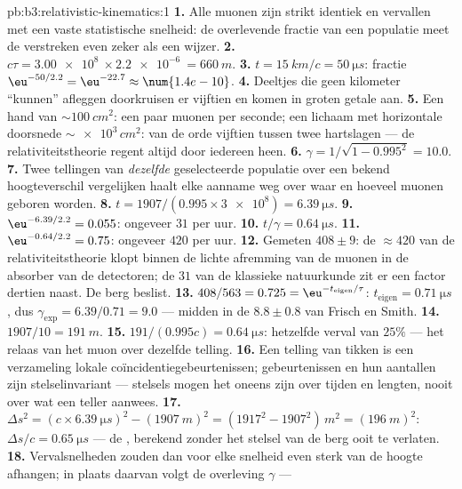 \begin{solution}{pb:b3:relativistic-kinematics:1}
\textbf{1.} Alle muonen zijn strikt identiek en vervallen met een vaste
statistische snelheid: de overlevende fractie van een populatie meet de
verstreken  even zeker als een wijzer.
\textbf{2.} $c\tau = \qty{3.00e8}{} \times \qty{2.2e-6}{} =
\qty{660}{m}$.
\textbf{3.} $t = \qty{15}{km}/c = \qty{50}{\micro s}$: fractie
$\eu^{-50/2.2} = \eu^{-22.7} \approx \num{1.4e-10}$.
\textbf{4.} Deeltjes die geen kilometer ``kunnen'' afleggen doorkruisen
er vijftien en komen in groten getale aan.
\textbf{5.} Een hand van $\sim\qty{100}{cm^2}$: een paar muonen per
seconde; een lichaam met horizontale doorsnede
$\sim\num{e3}\,\unit{cm^2}$: van de orde vijftien tussen twee
hartslagen --- de relativiteitstheorie regent altijd door iedereen heen.
\textbf{6.} $\gamma = 1/\sqrt{1 - 0.995^2} = 10.0$.
\textbf{7.} Twee tellingen van \emph{dezelfde} geselecteerde populatie
over een bekend hoogteverschil vergelijken haalt elke aanname weg over
waar en hoeveel muonen geboren worden.
\textbf{8.} $t = 1907/(0.995 \times \num{3e8}) = \qty{6.39}{\micro s}$.
\textbf{9.} $\eu^{-6.39/2.2} = 0.055$: ongeveer $31$ per uur.
\textbf{10.} $t/\gamma = \qty{0.64}{\micro s}$.
\textbf{11.} $\eu^{-0.64/2.2} = 0.75$: ongeveer $420$ per uur.
\textbf{12.} Gemeten $408 \pm 9$: de $\approx 420$ van de
relativiteitstheorie klopt binnen de lichte afremming van de muonen in
de absorber van de detectoren; de $31$ van de klassieke natuurkunde zit
er een factor dertien naast. De berg beslist.
\textbf{13.} $408/563 = 0.725 = \eu^{-t_{\text{eigen}}/\tau}$:
$t_{\text{eigen}} = \qty{0.71}{\micro s}$, dus $\gamma_{\exp} =
6.39/0.71 = 9.0$ --- midden in de $8.8 \pm 0.8$ van Frisch en Smith.
\textbf{14.} $1907/10 = \qty{191}{m}$.
\textbf{15.} $191/(0.995c) = \qty{0.64}{\micro s}$: hetzelfde verval van
$25\%$ --- het relaas van het muon over dezelfde telling.
\textbf{16.} Een telling van tikken is een verzameling lokale
coïncidentiegebeurtenissen; gebeurtenissen en hun aantallen zijn
stelselinvariant --- stelsels mogen het oneens zijn over tijden en
lengten, nooit over wat een teller aanwees.
\textbf{17.} $\Delta s^2 = (c \times \qty{6.39}{\micro s})^2 -
(\qty{1907}{m})^2 = (1917^2 - 1907^2)\,\unit{m^2} = (\qty{196}{m})^2$:
$\Delta s/c = \qty{0.65}{\micro s}$ --- de , berekend zonder
het stelsel van de berg ooit te verlaten.
\textbf{18.} Vervalsnelheden zouden dan voor elke snelheid even sterk van
de hoogte afhangen; in plaats daarvan volgt de overleving $\gamma$ ---

\end{solution}
